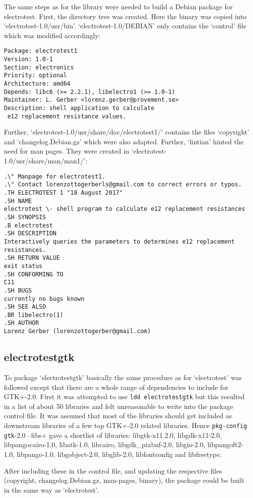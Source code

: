 \documentclass[a4paper,11pt,twoside]{article}
\begin{document}
The same steps as for the library were needed to build a Debian package for
electrotest. First, the directory tree was created. Here the binary was copied
into `electrotest-1.0/usr/bin'. `electrotest-1.0/DEBIAN' only contains the `control'
file which was modified accordingly:
\begin{verbatim}
Package: electrotest1
Version: 1.0-1
Section: electronics
Priority: optional
Architecture: amd64
Depends: libc6 (>= 2.2.1), libelectro1 (>= 1.0-1)
Maintainer: L. Gerber <lorenz.gerber@provement.se>
Description: shell application to calculate
 e12 replacement resistance values.
\end{verbatim}
Further, `electrotest-1.0/usr/share/doc/electrotest1/' contains the files
`copyright' and `changelog.Debian.gz' which were also adapted. Further, `lintian'
hinted the need for man pages. They were created in `electrotest-1.0/usr/share/man/man1/':
\begin{verbatim}
.\" Manpage for electrotest1.
.\" Contact lorenzottogerberls@gmail.com to correct errors or typos.
.TH ELECTROTEST 1 "18 August 2017"
.SH NAME
electrotest \- shell program to calculate e12 replacement resistances
.SH SYNOPSIS
.B electrotest
.SH DESCRIPTION
Interactively queries the parameters to determines e12 replacement resistances.
.SH RETURN VALUE
exit status
.SH CONFORMING TO
C11
.SH BUGS
currently no bugs known
.SH SEE ALSO
.BR libelectro(1)
.SH AUTHOR
Lorenz Gerber (lorenzottogerber@gmail.com)
\end{verbatim}

\subsection{electrotestgtk}
To package `electrotestgtk' basically the same procedure as for `electrotest'
was followed except that there are a whole range of dependencies to include for
GTK+-2.0. First it was attempted to use \verb+ldd electrotestgtk+ but this
resulted in a list of about 50 libraries and felt unreasonable to write into
the package control file. It was assumed that most of the libraries should get
included as downstream libraries of a few top GTK+-2.0 related libraries. Hence
\verb+pkg-config gtk+-2.0 --libs+ gave a shortlist of libraries: libgtk-x11.2.0,
libgdk-x11-2.0, libpangocairo-1.0, libatk-1.0, libcairo, libgdk\_pixbuf-2.0,
libgio-2.0, libpangoft2-1.0, libpango-1.0, libgobject-2.0, libglib-2.0, libfontconfig
and libfreetype.

After including these in the control file, and updating the respective files
(copyright, changelog.Debian.gz, man-pages, binary), the package could be built
in the same way as `electrotest'.








\end{document}
